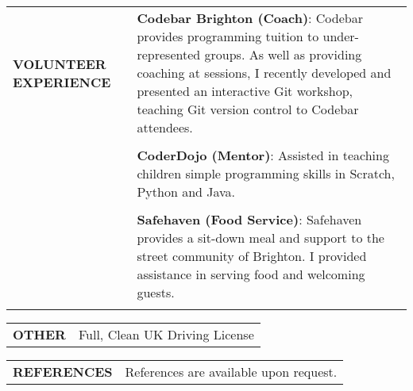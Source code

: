 \documentclass[7pt]{article}
\begin{document}
\vspace{0.25in}

\begin{tabular}{@{} p{} p{}}
  \textbf{VOLUNTEER EXPERIENCE} & \textbf{Codebar Brighton (Coach)}: Codebar provides programming tuition to under-represented groups. As well as providing coaching at sessions, I recently developed and presented an interactive Git workshop, teaching Git version control to Codebar attendees. \\
  & \\
  & \textbf{CoderDojo (Mentor)}: Assisted in teaching children simple programming skills in Scratch, Python and Java. \\
  & \\
  & \textbf{Safehaven (Food Service)}: Safehaven provides a sit-down meal and support to the street community of Brighton. I provided assistance in serving food and welcoming guests.\\
  & \\
\end{tabular}

\vspace{0.25in}

\begin{tabular}{@{} p{} p{}}
  \textbf{OTHER} & Full, Clean UK Driving License
\end{tabular}

\vspace{0.25in}

\begin{tabular}{@{} p{} p{}}
  \textbf{REFERENCES} & References are available upon request.
\end{tabular}

\bigskip
\end{document}
